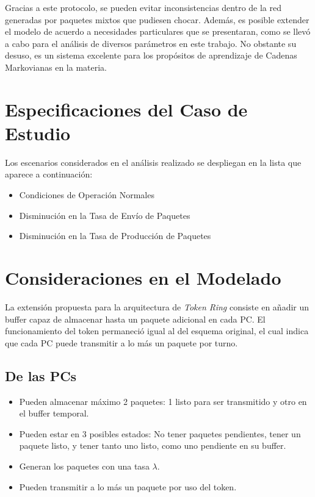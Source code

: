 \documentclass[12pt,letterpaper,oneside]{article}
\begin{document}
    Gracias a este protocolo, se pueden evitar inconsistencias dentro de la red generadas por paquetes mixtos que pudiesen chocar. Además, es posible extender el modelo de acuerdo a necesidades particulares que se presentaran, como se llevó a cabo para el análisis de diversos parámetros en este trabajo. No obstante su desuso, es un sistema excelente para los propósitos de aprendizaje de Cadenas Markovianas en la materia.
    
    \section{Especificaciones del Caso de Estudio}
      \noindent Los escenarios considerados en el análisis realizado se despliegan en la lista que aparece a continuación:
    
      \begin{itemize}
        \item[\textendash] Condiciones de Operación Normales
        \item[\textendash] Disminución en la Tasa de Envío de Paquetes
        \item[\textendash] Disminución en la Tasa de Producción de Paquetes
      \end{itemize}
      
    \section{Consideraciones en el Modelado}
      La extensión propuesta para la arquitectura de \textit{Token Ring} consiste en añadir un buffer capaz de almacenar hasta un paquete adicional en cada PC. El funcionamiento del token permaneció igual al del esquema original, el cual indica que cada PC puede transmitir a lo más un paquete por turno.
      
      \subsection{De las PCs}
        
        \begin{itemize}
          \item Pueden almacenar máximo 2 paquetes: 1 listo para ser transmitido y otro en el buffer temporal.
          \item Pueden estar en 3 posibles estados: No tener paquetes pendientes, tener un paquete listo, y tener tanto uno listo, como uno pendiente en su buffer.
          \item Generan los paquetes con una tasa $\lambda$.
          \item Pueden transmitir a lo más un paquete por uso del token.
        \end{itemize}
        
\end{document}
